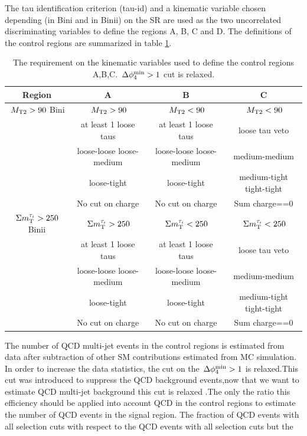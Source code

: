 The tau identification criterion (tau-id) and a kinematic variable chosen depending (\mttwo in Bini and \SumMT in Binii)
on the SR are used as the two uncorrelated discriminating variables to define the regions A, B, C and D. The definitions of the control regions are summarized in table \ref{2QCDbg}.
\begin{table}
\begin{center}
\begin{tabular}{|c|c|c|c|}
\hline
Region&A& B & C
\\ \hline\hline
$\,{M_{\rm T2}}>90$ Bini &$\,{M_{\rm T2}} >90$ & $\,{M_{\rm T2}} <90$&$\,{M_{\rm T2}} <90$ \\
&at least 1 loose taus&at least 1 loose taus& loose tau veto\\
&loose-loose loose-medium &loose-loose loose-medium &medium-medium \\
&loose-tight&loose-tight&medium-tight tight-tight\\
&No cut on charge&No cut on charge& Sum charge==0\\
\hline
$\,\Sigma m_{\rm T}^{\tau_i}>250$ Binii &$\,\Sigma m_{\rm T}^{\tau_i} >250$ &$\,\Sigma m_{\rm T}^{\tau_i} <250$&$\,\Sigma m_{\rm T}^{\tau_i} < 250$\\
&at least 1 loose taus&at least 1 loose taus& loose tau veto\\
&loose-loose loose-medium &loose-loose loose-medium &medium-medium \\
&loose-tight&loose-tight&medium-tight tight-tight\\
&No cut on charge&No cut on charge& Sum charge==0\\
\hline
\end{tabular}
\caption{The requirement on the kinematic variables used to define the control regions A,B,C.
$\,{\Delta\phi_{4}^{\rm min}}>1$ cut is relaxed. }
\label{2QCDbg}
\end{center}
\end{table}
The number of QCD multi-jet events in the control regions is estimated from data after subtraction of other SM contributions estimated from MC simulation.
In order to increase the data statistics, the cut on the $\,{\Delta\phi_{4}^{\rm min}}>1$ is relaxed.This cut was
introduced to suppress the QCD background events,now that we want to estimate QCD multi-jet background this cut is relaxed .The only the ratio this efficiency should be
applied into account QCD in the control regions to estimate the number of QCD events in the signal region.
The fraction of QCD events with all selection cuts with respect to the QCD events with all selection cuts but the
